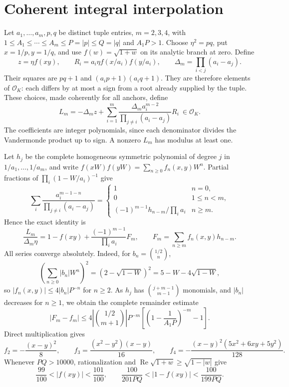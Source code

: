 \documentclass[12pt]{article}
\numberwithin{equation}{section}
\begin{document}
\section{Coherent integral interpolation}\label{sec:coherent-interpolation}

Let \(a_1,\ldots,a_m,p,q\) be distinct tuple entries, \(m=2,3,4\), with
\(1\le A_1\le\cdots\le A_m\le P=|p|\le Q=|q|\) and \(A_1P>1\).
Choose \(\eta^2=pq\), put \(x=1/p,y=1/q\), and use
\(f(w)=\sqrt{1+w}\) on its analytic branch at zero. Define
\[
 z=\eta f(xy),\qquad
 R_i=a_i\eta f(x/a_i)f(y/a_i),\qquad
 \Delta_m=\prod_{i<j}(a_i-a_j).
\]
Their squares are \(pq+1\) and \((a_ip+1)(a_iq+1)\).
They are therefore elements of \(\mathcal O_K\): each differs by at
most a sign from a root already supplied by the tuple. These choices,
made coherently for all anchors, define
\begin{equation}\label{eq:coherent-form}
 L_m=-\Delta_m z+
 \sum_{i=1}^m
 \frac{\Delta_m a_i^{m-2}}{\prod_{j\ne i}(a_i-a_j)}R_i
 \ \in\mathcal O_K.
\end{equation}
The coefficients are integer polynomials, since each denominator divides
the Vandermonde product up to sign. A nonzero \(L_m\) has modulus at least one.

Let \(h_j\) be the complete homogeneous symmetric polynomial of degree
\(j\) in \(1/a_1,\ldots,1/a_m\), and write
\(f(xW)f(yW)=\sum_{n\ge0}f_n(x,y)W^n\).
Partial fractions of \(\prod_i(1-W/a_i)^{-1}\) give
\[
 \sum_i\frac{a_i^{m-1-n}}{\prod_{j\ne i}(a_i-a_j)}
 =\begin{cases}
 1&n=0,\\
 0&1\le n<m,\\
 (-1)^{m-1}h_{n-m}/\prod_i a_i&n\ge m.
 \end{cases}
\]
Hence the exact identity is
\begin{equation}\label{eq:coherent-exact}
 \frac{L_m}{\Delta_m\eta}
 =1-f(xy)+\frac{(-1)^{m-1}}{\prod_i a_i}F_m,\qquad
 F_m=\sum_{n\ge m}f_n(x,y)h_{n-m}.
\end{equation}
All series converge absolutely. Indeed, for \(b_n=\binom{1/2}{n}\),
\[
 \left(\sum_{n\ge0}|b_n|W^n\right)^2
 =(2-\sqrt{1-W})^2=5-W-4\sqrt{1-W},
\]
so \(|f_n(x,y)|\le4|b_n|P^{-n}\) for \(n\ge2\).
As \(h_j\) has \(\binom{j+m-1}{m-1}\) monomials, and \(|b_n|\)
decreases for \(n\ge1\), we obtain the complete remainder estimate
\begin{equation}\label{eq:coherent-tail}
 |F_m-f_m|\le
 4\left|\binom{1/2}{m+1}\right|P^{-m}
 \left[\left(1-\frac1{A_1P}\right)^{-m}-1\right].
\end{equation}
Direct multiplication gives
\begin{equation}\label{eq:integrated-5}
f_2=-\frac{(x-y)^2}{8},\qquad
 f_3=\frac{(x^2-y^2)(x-y)}{16},\qquad
 f_4=-\frac{(x-y)^2(5x^2+6xy+5y^2)}{128}.
\end{equation}
Whenever \(PQ>10000\), rationalization and
\(\operatorname{Re}\sqrt{1+w}\ge\sqrt{1-|w|}\) give
\begin{equation}\label{eq:coherent-near-one}
 \frac{99}{100}<|f(xy)|<\frac{101}{100},\qquad
 \frac{100}{201PQ}<|1-f(xy)|<\frac{100}{199PQ}.
\end{equation}
\end{document}
